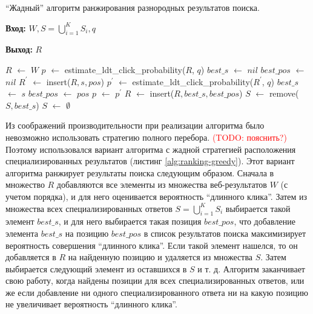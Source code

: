 \documentclass[12pt,a4paper]{report}
\makeatletter
\newcommand\note[1]{\textcolor{red}{(#1)}}
\newcommand\todonote[1]{\note{TODO: #1}}
\newenvironment{myalgorithm}[1][htb]{%
    \renewcommand{\ALG@name}{Алгоритм}%
   \begin{algorithm}[#1]%
  }{\end{algorithm}}
\newcommand*\Let[2]{\State #1 $\gets$ #2}
\makeatother
\begin{document}
\begin{myalgorithm}[t!]
\caption{``Жадный'' алгоритм ранжирования разнородных результатов поиска.}
\label{alg:ranking-greedy}
\textbf{Вход:} $W, S=\bigcup\limits_{i=1}^{K} S_i, q$ \par
\textbf{Выход:} $R$
\begin{algorithmic}[1]
    \Let{$R$}{$W$}
    \Let{$p$}{estimate\_ldt\_click\_probability($R$, $q$)}
      \Let{$best\_s$}{$nil$}
      \Let{$best\_pos$}{$nil$}
          \Let{$R^{'}$}{insert($R, s, pos$)}        
          \Let{$p^{'}$}{estimate\_ldt\_click\_probability($R^{'}$, $q$)}
            \Let{$best\_s$}{$s$}
            \Let{$best\_pos$}{$pos$}            
            \Let{$p$}{$p^{'}$}
          \EndIf
        \EndFor
      \EndFor
        \Let{$R$}{insert($R, best\_s, best\_pos$)}
        \Let{$S$}{remove($S, best\_s$)}   
      \Else %
        \Let{$S$}{$\emptyset$}
      \EndIf
    \EndWhile
\EndFunction
\end{algorithmic}
\end{myalgorithm}

Из соображений производительности при реализации алгоритма было невозможно использовать стратегию полного перебора. 
\todonote{пояснить?}
Поэтому использовался вариант алгоритма с жадной стратегией расположения специализированных результатов (листинг \ref{alg:ranking-greedy}). Этот вариант алгоритма ранжирует результаты поиска следующим образом. Сначала в множество $R$ добавляются все элементы из множества веб-результатов $W$ (с учетом порядка), и для него оценивается вероятность ``длинного клика''. Затем из множества всех специализированных ответов $S=\bigcup\limits_{i=1}^{K} S_i$ выбирается такой элемент $best\_s$, и для него выбирается такая позиция $best\_pos$, что добавление элемента $best\_s$ на позицию $best\_pos$ в список результатов поиска максимизирует вероятность совершения ``длинного клика''. Если такой элемент нашелся, то он добавляется в $R$ на найденную позицию и удаляется из множества $S$. Затем выбирается следующий элемент из оставшихся в $S$ и т. д. Алгоритм заканчивает свою работу, когда найдены позиции для всех специализированных ответов, или же если добавление ни одного специализированного ответа ни на какую позицию не увеличивает вероятность ``длинного клика''.
\end{document}
